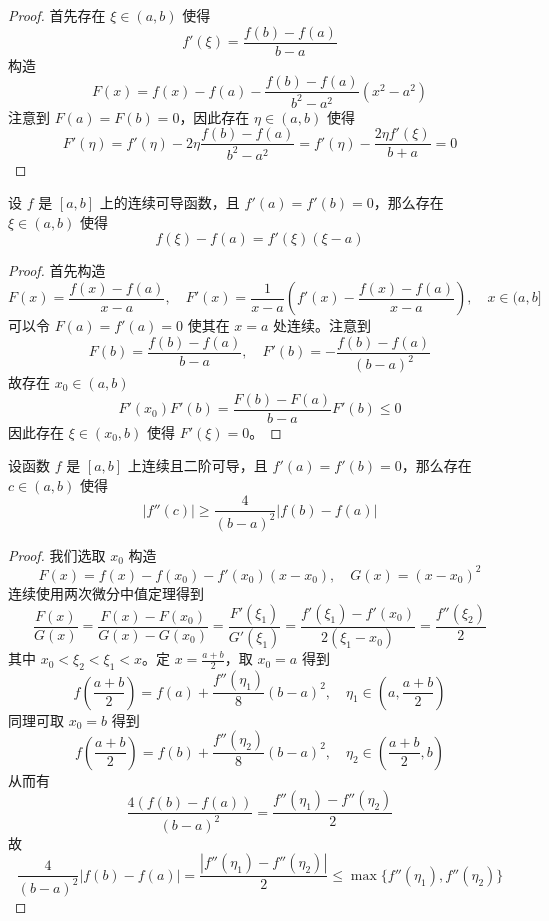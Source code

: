 \begin{proof}
	首先存在 $\xi \in (a,b)$ 使得
	\[ f'(\xi) = \frac{f(b) - f(a)}{b - a} \]
	构造
	\[ F(x) = f(x) - f(a) - \frac{f(b) - f(a)}{b^2 - a^2}(x^2 - a^2) \]
	注意到 $F(a) = F(b) = 0$，因此存在 $\eta \in (a, b)$ 使得
	\[ F'(\eta) = f'(\eta) - 2 \eta \frac{f(b) - f(a)}{b^2 - a^2} = f'(\eta) - \frac{2 \eta f'(\xi)}{b + a} = 0 \]
\end{proof}

\begin{proposition}
	设 $f$ 是 $[a,b]$ 上的连续可导函数，且 $f'(a) = f'(b) = 0$，那么存在 $\xi \in (a,b)$ 使得
	\[ f(\xi) - f(a) = f'(\xi)(\xi - a) \]
\end{proposition}

\begin{proof}
	首先构造
	\[ F(x) = \frac{f(x) - f(a)}{x - a}, \quad F'(x) = \frac{1}{x-a} \left(f'(x) - \frac{f(x) - f(a)}{x-a}\right), \quad x \in (a, b] \]
	可以令 $F(a) = f'(a) = 0$ 使其在 $x=a$ 处连续。注意到
	\[ F(b) = \frac{f(b) - f(a)}{b-a}, \quad F'(b) = -\frac{f(b) - f(a)}{(b-a)^2} \]
	故存在 $x_0 \in (a, b)$
	\[ F'(x_0) F'(b) = \frac{F(b) - F(a)}{b - a} F'(b) \leqslant 0 \]
	因此存在 $\xi \in (x_0, b)$ 使得 $F'(\xi) = 0$。
\end{proof}

\begin{proposition}
	设函数 $f$ 是 $[a,b]$ 上连续且二阶可导，且 $f'(a) = f'(b) = 0$，那么存在 $c \in (a,b)$ 使得
	\[ |f''(c)| \geqslant \frac{4}{(b-a)^2} |f(b) - f(a)| \]
\end{proposition}

\begin{proof}
	我们选取 $x_0$ 构造
	\[ F(x) = f(x) - f(x_0) - f'(x_0)(x-x_0) , \quad G(x) = (x-x_0)^2 \]
	连续使用两次微分中值定理得到
	\[ \frac{F(x)}{G(x)} = \frac{F(x) - F(x_0)}{G(x) - G(x_0)} = \frac{F'(\xi_1)}{G'(\xi_1)} = \frac{f'(\xi_1) - f'(x_0)}{2 (\xi_1 - x_0)} = \frac{f''(\xi_2)}{2} \]
	其中 $x_0 < \xi_2 < \xi_1 < x$。定 $x=\frac{a+b}{2}$，取 $x_0 = a$ 得到
	\[ f\left(\frac{a+b}{2}\right) = f(a) + \frac{f''(\eta_1)}{8} (b-a)^2, \quad \eta_1 \in \left(a, \frac{a+b}{2}\right) \]
	同理可取 $x_0 = b$ 得到
	\[ f\left(\frac{a+b}{2}\right) = f(b) + \frac{f''(\eta_2)}{8} (b-a)^2, \quad \eta_2 \in \left(\frac{a+b}{2}, b\right) \]
	从而有
	\[ \frac{4(f(b) - f(a))}{(b-a)^2} = \frac{f''(\eta_1) - f''(\eta_2)}{2} \]
	故
	\[ \frac{4}{(b-a)^2}|f(b) - f(a)| = \frac{|f''(\eta_1) - f''(\eta_2)|}{2} \leqslant \max\{f''(\eta_1), f''(\eta_2)\} \]
\end{proof}

